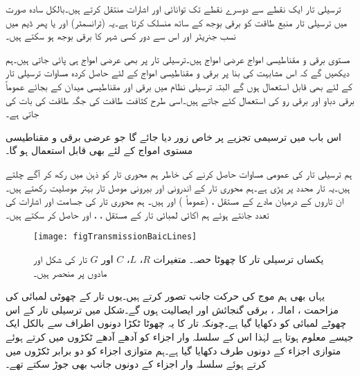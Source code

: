 ترسیلی تار ایک نقطے سے  دوسرے نقطے تک توانائی اور اشارات منتقل کرتے ہیں۔بالکل سادہ صورت میں ترسیلی تار منبع طاقت کو برقی بوجھ کے ساتھ منسلک کرتا ہے۔یہ  (ٹرانسمٹر)  اور  یا پھر ڈیم میں نسب جنریٹر اور اس سے دور کسی شہر کا برقی بوجھ ہو سکتے ہیں۔

مستوی برقی و مقناطیسی امواج عرضی امواج ہیں۔ترسیلی تار پر بھی عرضی امواج ہی پائی جاتی ہیں۔ہم دیکھیں گے کہ اس مشابہت کی بنا پر برقی و مقناطیسی امواج کے لئے حاصل کردہ مساوات ترسیلی تار کے لئے بھی قابل استعمال ہوں گے البتہ ترسیلی نظام میں برقی اور مقناطیسی میدان کے بجائے عموماً برقی دباو اور برقی رو کی استعمال کئے جاتے ہیں۔اسی طرح کثافت طاقت کی جگہ طاقت کی بات کی جاتی ہے۔

اس باب میں ترسیمی تجزیے پر خاص زور  دیا جائے گا جو عرضی برقی و مقناطیسی مستوی امواج کے لئے بھی قابل استعمال ہو گا۔ 

ہم ترسیلی تار کی عمومی مساوات حاصل کرنے کی خاطر ہم محوری تار کو ذہن میں رکھ کر آگے چلتے ہیں۔یہ تار  محدد پر پڑی ہے۔ہم محوری تار کے اندرونی اور بیرونی موصل تار بہتر موصلیت  رکھتے ہیں۔ان تاروں کے درمیان  مادے کے مستقل ،  (عموماً ) اور  ہیں۔ 
ہم محوری تار کی جسامت اور اشارات کی تعدد جانتے ہوئے ہم اکائی لمبائی تار کے مستقل ، ،  اور  حاصل کر سکتے ہیں۔

\begin{figure}
\centering
\texttt{[image: figTransmissionBaicLines]}
\caption{یکساں ترسیلی تار کا چھوٹا حصہ۔ متغیرات $R$، $L$، $C$ اور $G$ تار کی شکل اور مادوں پر منحصر ہیں۔}
\label{شکل_ترسیل_سادہ_نظام}
\end{figure}

یہاں بھی ہم موج کی حرکت  جانب تصور کرتے ہیں۔یوں تار کے چھوٹی لمبائی  کی مزاحمت ، امالہ ، برقی گنجائش  اور ایصالیت  ہوں گے۔شکل  میں ترسیلی تار کے اس چھوٹے لمبائی کو دکھایا گیا ہے۔چونکہ تار کا یہ چھوٹا ٹکڑا دونوں اطراف سے بالکل ایک جیسے معلوم ہوتا ہے  لہٰذا اس کے سلسلہ وار اجزاء کو آدھے آدھے ٹکڑوں میں کرتے ہوئے متوازی اجزاء کے دونوں طرف دکھایا گیا ہے۔ہم متوازی اجزاء کو دو برابر ٹکڑوں میں کرتے ہوئے سلسلہ وار اجزاء کے دونوں جانب بھی جوڑ سکتے تھے۔

